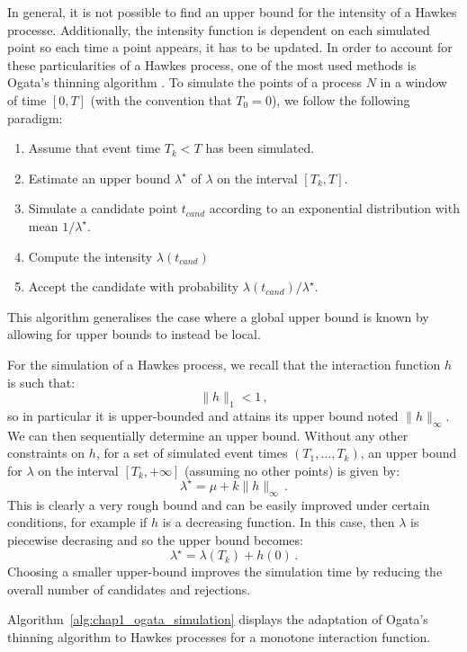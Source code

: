 In general, it is not possible to find an upper bound for the intensity of a Hawkes processe. Additionally, the intensity function is dependent on each simulated point so each time a point appears, it has to be updated. In order to account for these particularities of a Hawkes process, one of the most used methods is Ogata's thinning algorithm \parencite{Ogata1981}.
To simulate the points of a process $N$ in a window of time $[0,T]$ (with the convention that $T_0 = 0$), we follow the following paradigm:

\begin{enumerate}
\item Assume that event time $T_k < T$ has been simulated.
\item Estimate an upper bound $\lambda^\star$ of $\lambda$ on the interval $[T_k, T]$.
\item Simulate a candidate point $t_{cand}$ according to an exponential distribution with mean $1 / \lambda^\star$.
\item Compute the intensity $\lambda(t_{cand})$
\item Accept the candidate with probability $\lambda(t_{cand}) / \lambda^\star$.
\end{enumerate}
This algorithm generalises the case where a global upper bound is known by allowing for upper bounds to instead be local.

For the simulation of a Hawkes process, we recall that the interaction function $h$ is such that:
\[\|h\|_1 < 1\,,\]
so in particular it is upper-bounded and attains its upper bound noted $\|h\|_{\infty}$. We can then sequentially determine an upper bound. Without any other constraints on $h$, for a set of simulated event times $(T_1, \ldots, T_k)$, an upper bound for $\lambda$ on the interval $[T_k, +\infty]$ (assuming no other points) is given by:
\[\lambda^\star = \mu + k\|h\|_{\infty}\,.\]
This is clearly a very rough bound and can be easily improved under certain conditions, for example if $h$ is a decreasing function. In this case, then $\lambda$ is piecewise decrasing and so the upper bound becomes:
\[\lambda^\star = \lambda(T_k) + h(0)\,.\]
Choosing a smaller upper-bound improves the simulation time by reducing the overall number of candidates and rejections.

Algorithm~\ref{alg:chap1_ogata_simulation} displays the adaptation of Ogata's thinning algorithm to Hawkes processes for a monotone interaction function.

